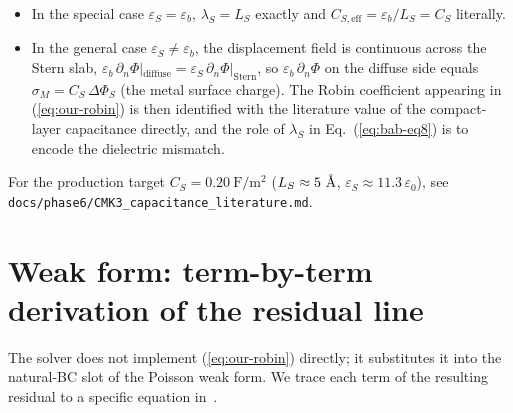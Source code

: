 \documentclass[11pt]{article}
\newcommand{\CS}{C_{\!S}}
\newcommand{\CSeff}{C_{\!S,\mathrm{eff}}}
\newcommand{\eb}{\varepsilon_{b}}
\newcommand{\eS}{\varepsilon_{S}}
\begin{document}
\begin{itemize}
\item In the special case $\eS=\eb$, $\lambda_{S}=L_{S}$ exactly and
$\CSeff=\eb/L_{S}=\CS$ literally.
\item In the general case $\eS\neq\eb$, the displacement field is
continuous across the Stern slab,
$\eb\,\partial_{n}\Phi|_{\mathrm{diffuse}} =
\eS\,\partial_{n}\Phi|_{\mathrm{Stern}}$, so
$\eb\,\partial_{n}\Phi$ on the diffuse side equals
$\sigma_{M}=\CS\,\Delta\Phi_{S}$ (the metal surface charge). The Robin
coefficient appearing in (\ref{eq:our-robin}) is then identified with
the literature value of the compact-layer capacitance directly, and
the role of $\lambda_{S}$ in Eq.~(\ref{eq:bab-eq8}) is to encode the
dielectric mismatch.
\end{itemize}
For the production target $\CS=0.20~\mathrm{F/m^{2}}$
($L_{S}\approx 5~\textup{\AA}$, $\eS\approx 11.3\,\varepsilon_{0}$),
see \texttt{docs/phase6/CMK3\_capacitance\_literature.md}.

\section{Weak form: term-by-term derivation of the residual line}

The solver does not implement (\ref{eq:our-robin}) directly; it
substitutes it into the natural-BC slot of the Poisson weak form.
We trace each term of the resulting residual to a specific equation
in~\cite{bonnefont2001}.
\end{document}
